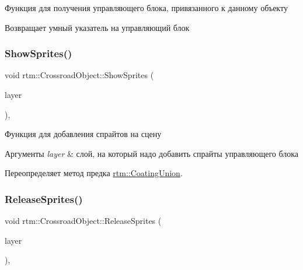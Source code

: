 Функция для получения управляющего блока, привязанного к данному объекту \begin{DoxyReturn}{Возвращает}
умный указатель на управляющий блок 
\end{DoxyReturn}
\mbox{\label{classrtm_1_1_crossroad_object_a2de2a5dac2ba2ca573cfa65a2633de9b}} 
\subsubsection{\texorpdfstring{Show\+Sprites()}{ShowSprites()}}
{\footnotesize\ttfamily void rtm\+::\+Crossroad\+Object\+::\+Show\+Sprites (\begin{DoxyParamCaption}\item[{cocos2d\+::\+Layer $\ast$const}]{layer }\end{DoxyParamCaption})\hspace{0.3cm}{\ttfamily [override]}, {\ttfamily [virtual]}}

Функция для добавления спрайтов на сцену 
\begin{DoxyParams}{Аргументы}
{\em layer} & слой, на который надо добавить спрайты управляющего блока \\
\hline
\end{DoxyParams}


Переопределяет метод предка \hyperlink{classrtm_1_1_coating_union_ae95be187677aec759723edb4d14b35c1}{rtm\+::\+Coating\+Union}.

\mbox{\label{classrtm_1_1_crossroad_object_a92e9357697edecc69564fd4d40524a3b}} 
\subsubsection{\texorpdfstring{Release\+Sprites()}{ReleaseSprites()}}
{\footnotesize\ttfamily void rtm\+::\+Crossroad\+Object\+::\+Release\+Sprites (\begin{DoxyParamCaption}\item[{cocos2d\+::\+Layer $\ast$const}]{layer }\end{DoxyParamCaption})\hspace{0.3cm}{\ttfamily [override]}, {\ttfamily [virtual]}}

